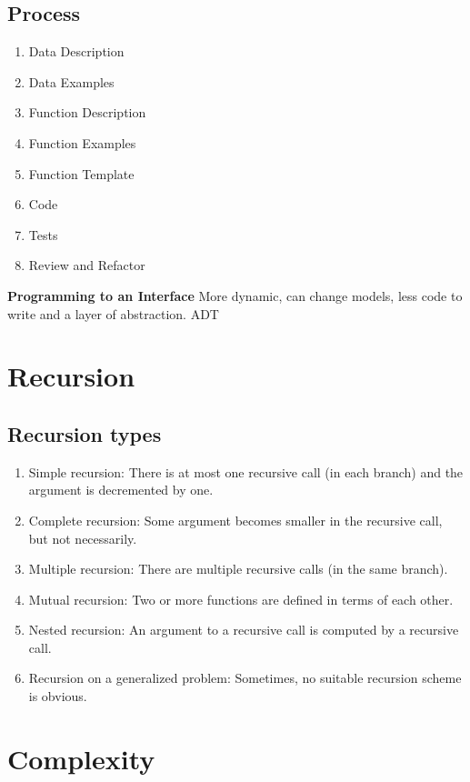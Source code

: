 \subsection{Process}
\begin{enumerate}
\item  Data Description
\item  Data Examples
\item  Function Description
\item  Function Examples
\item  Function Template
\item  Code
\item  Tests
\item  Review and Refactor
\end{enumerate}

\textbf{Programming to an Interface}
More dynamic, can change models, less code to write and a layer of abstraction. ADT 

\newpage

\section{Recursion}
\subsection{Recursion types}
\begin{enumerate}
\item Simple recursion: There is at most one recursive call (in each branch)
  and the argument is decremented by one.
\item Complete recursion: Some argument becomes smaller in the recursive call, but not necessarily.
\item Multiple recursion: There are multiple recursive calls (in the same branch).
\item Mutual recursion: Two or more functions are defined in terms of each other.
\item Nested recursion: An argument to a recursive call is computed by a recursive call.
\item Recursion on a generalized problem: Sometimes, no suitable recursion scheme is obvious.
\end{enumerate}



\section{Complexity}
